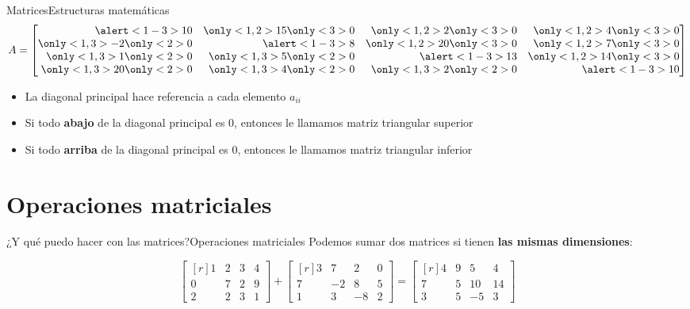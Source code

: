 \documentclass[spanish, c]{beamer}
\begin{document}
\begin{frame}{Matrices}{Estructuras matemáticas}
    \[%
        A =
        \begin{bmatrix*}[r]
        \alert<1-3>{10}            & \only<1,2>{15} \only<3>{0} & \only<1,2>{2} \only<3>{0}  & \only<1,2>{4} \only<3>{0} \\
        \only<1,3>{-2} \only<2>{0} & \alert<1-3>{8}             & \only<1,2>{20} \only<3>{0} & \only<1,2>{7} \only<3>{0} \\
        \only<1,3>{1} \only<2>{0}  & \only<1,3>{5} \only<2>{0}  & \alert<1-3>{13}             & \only<1,2>{14} \only<3>{0} \\
        \only<1,3>{20} \only<2>{0} & \only<1,3>{4} \only<2>{0}  & \only<1,3>{2} \only<2>{0}  & \alert<1-3>{10}
        \end{bmatrix*}
    \]

    \begin{itemize}
        \item La \alert<1>{diagonal principal} hace referencia a cada elemento $a_{ii}$
        \item Si todo \textbf{abajo} de la diagonal principal es 0, entonces le llamamos \alert<2>{matriz triangular superior}
        \item Si todo \textbf{arriba} de la diagonal principal es 0, entonces le llamamos \alert<3>{matriz triangular inferior}
    \end{itemize}

\end{frame}

\section{Operaciones matriciales}

\begin{frame}{¿Y qué puedo hacer con las matrices?}{Operaciones matriciales}
    Podemos \alert{sumar dos matrices} si tienen \textbf{las mismas dimensiones}:

    \[%
        \begin{bmatrix*}[r]
            1 & 2 & 3 & 4 \\
            0 & 7 & 2 & 9 \\
            2 & 2 & 3 & 1
        \end{bmatrix*} +
        \begin{bmatrix*}[r]
            3 & 7 & 2 & 0 \\
            7 & -2 & 8 & 5 \\
            1 & 3 & -8 & 2
        \end{bmatrix*} =
        \begin{bmatrix*}[r]
            4 & 9 & 5 & 4 \\
            7 & 5& 10 & 14 \\
            3 & 5 & -5 & 3
        \end{bmatrix*} \]

\end{frame}
\end{document}

